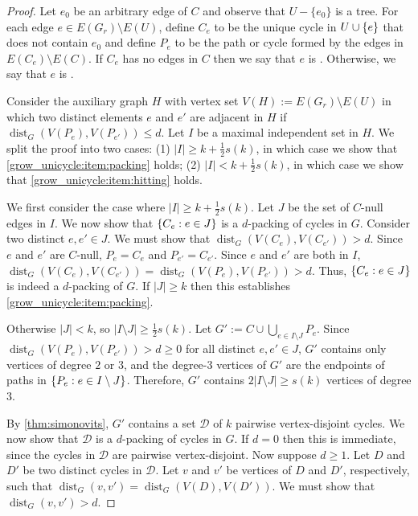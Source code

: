 \documentclass{patmorin}
\DeclareMathOperator{\dist}{dist}
\DeclarePairedDelimiter\set{\{}{\}}
\renewcommand{\mid}{:}  %
\begin{document}
\begin{proof}
  Let $e_0$ be an arbitrary edge of $C$ and observe that $U-\{e_0\}$ is a tree.  For each edge $e\in E(G_{r})\setminus E(U)$,  define $C_e$ to be the unique cycle in $U\cup \set{e}$
  that does not contain $e_0$ and define $P_{e}$ to be the path or cycle formed by the edges in $E(C_{e})\setminus E(C)$.
  If $C_e$ has no edges in $C$ then we say that $e$ is .
  Otherwise, we say that $e$ is .

  Consider the auxiliary graph $H$ with vertex set $V(H):= E(G_{r})\setminus E(U)$ in which two distinct elements $e$ and $e'$ are adjacent in $H$ if $\dist_G(V(P_{e}),V(P_{e'})) \le d$.  Let $I$ be a maximal independent set in $H$.
  We split the proof into two cases:
  (1) $|I|\ge k+\frac{1}{2}s(k)$, in which case we show that \cref{grow_unicycle:item:packing} holds;
  (2) $|I|< k+\frac{1}{2}s(k)$, in which case we show that \cref{grow_unicycle:item:hitting} holds.

  We first consider the case where $|I|\ge k+\frac{1}{2}s(k)$.  Let $J$ be the set of $C$-null edges in $I$.
  We now show that $\set{C_e \mid e\in J}$ is a $d$-packing of cycles in $G$.  Consider two distinct $e,e'\in J$.  We must show that $\dist_G(V(C_e),V(C_{e'}))>d$.
  Since $e$ and $e'$ are $C$-null, $P_e=C_e$ and $P_{e'}=C_{e'}$.
  Since $e$ and $e'$ are both in $I$, $\dist_G(V(C_e),V(C_{e'}))=\dist_G(V(P_e),V(P_{e'}))>d$.
  Thus, $\set{C_e \mid e\in J}$ is indeed a $d$-packing of $G$.  If $|J|\ge k$ then this establishes \eqref{grow_unicycle:item:packing}.

  Otherwise $|J|<k$, so $|I\setminus J|\ge \tfrac{1}{2}s(k)$.
  Let $G':=C\cup\bigcup_{e\in I\setminus J} P_e$.
  Since $\dist_G(V(P_e),V(P_{e'}))>d\ge0$ for all distinct $e,e'\in J$, $G'$ contains only vertices of degree $2$ or $3$, and the degree-$3$ vertices of $G'$ are the endpoints of paths in $\set{P_e \mid e\in I\setminus J}$.
  Therefore, $G'$ contains $2|I\setminus J|\geq s(k)$ vertices of degree $3$.

  By \cref{thm:simonovits}, $G'$ contains a set $\mathcal{D}$ of $k$ pairwise vertex-disjoint cycles.
  We now show that $\mathcal{D}$ is a $d$-packing of cycles in $G$.  If $d=0$ then this is immediate, since the cycles in $\mathcal{D}$ are pairwise vertex-disjoint.  Now suppose $d\ge 1$.
  Let $D$ and $D'$ be two distinct cycles in $\mathcal{D}$.
  Let $v$ and $v'$ be vertices of $D$ and $D'$, respectively,
  such that $\dist_G(v,v')=\dist_G(V(D),V(D'))$.  We must show that $\dist_G(v,v')>d$.



\end{proof}
\end{document}
